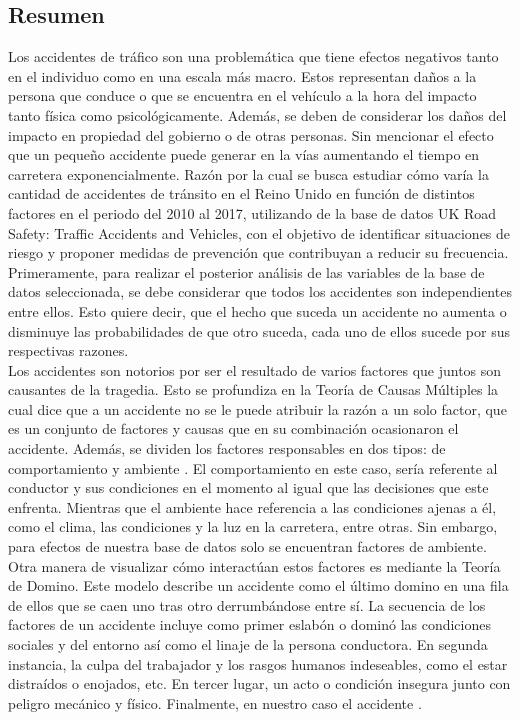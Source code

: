 \documentclass[12pt]{article}
\begin{document}
\subsection{Resumen}
Los accidentes de tráfico son una problemática que tiene efectos negativos tanto en el individuo como en una escala más macro. 
Estos representan daños a la persona que conduce o que se encuentra en el vehículo a la hora del impacto tanto física como psicológicamente.  
Además, se deben de considerar los daños del impacto en propiedad del gobierno o de otras personas. 
Sin mencionar el efecto que un pequeño accidente puede generar en la vías aumentando el tiempo en carretera exponencialmente. 
Razón por la cual se busca estudiar cómo varía la cantidad de accidentes de tránsito en el Reino Unido en función de 
distintos factores en el periodo del 2010 al 2017, utilizando de la base de datos UK Road Safety: Traffic Accidents and Vehicles, 
con el objetivo de identificar situaciones de riesgo y proponer medidas de prevención que contribuyan a reducir su frecuencia. \\ 


Primeramente, para realizar el posterior análisis de las variables de la base de datos seleccionada, se debe considerar que
todos los accidentes son independientes entre ellos. Esto quiere decir, que el hecho que suceda un accidente no aumenta 
o disminuye las probabilidades de que otro suceda, cada uno de ellos sucede por sus respectivas razones.  \\

Los accidentes son notorios por ser el resultado de varios factores que juntos son causantes de la tragedia. 
Esto se profundiza en la Teoría de Causas Múltiples la cual dice que a un accidente no se le puede atribuir 
la razón a un solo factor, que es un conjunto de factores y causas que en su combinación ocasionaron el accidente. 
Además, se dividen los factores responsables en dos tipos: de comportamiento y ambiente \parencite{HOSSEINIAN2012}. 
El comportamiento en este caso, sería referente al conductor y sus condiciones en el momento al igual que las 
decisiones que este enfrenta. Mientras que el ambiente hace referencia a las condiciones ajenas a él, como el 
clima, las condiciones y la luz en la carretera, entre otras. Sin embargo, para efectos de nuestra base de datos solo se encuentran factores de ambiente.\\


Otra manera de visualizar cómo interactúan estos factores es mediante la Teoría de Domino. 
Este modelo describe un accidente como el último domino en una fila de ellos que se caen 
uno tras otro derrumbándose entre sí. La secuencia de los factores de un accidente incluye 
como primer eslabón o dominó las condiciones sociales y del entorno así como el linaje de la persona
conductora. En segunda instancia, la culpa del trabajador y los rasgos humanos indeseables, 
como el estar distraídos o enojados, etc. En tercer lugar, un acto o condición insegura junto
con peligro mecánico y físico. Finalmente, en nuestro caso el accidente \parencite{SAXENA2017}.  \\
\end{document}
